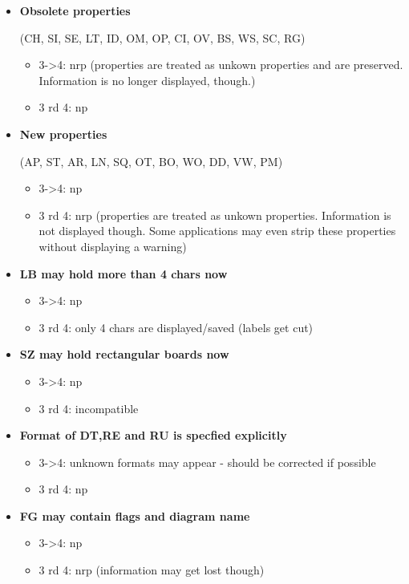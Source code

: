 \begin{itemize}
\item
  \textbf{Obsolete properties}

  (CH, SI, SE, LT, ID, OM, OP, CI, OV, BS, WS, SC, RG)

  \begin{itemize}
  \item
    3-\textgreater4: nrp (properties are treated as unkown properties
    and are preserved. Information is no longer displayed, though.)
  \item
    3 rd 4: np
  \end{itemize}
\item
  \textbf{New properties}

  (AP, ST, AR, LN, SQ, OT, BO, WO, DD, VW, PM)

  \begin{itemize}
  \item
    3-\textgreater4: np
  \item
    3 rd 4: nrp (properties are treated as unkown properties.
    Information is not displayed though. Some applications may even
    strip these properties without displaying a warning)
  \end{itemize}
\item
  \textbf{LB may hold more than 4 chars now}

  \begin{itemize}
  \item
    3-\textgreater4: np
  \item
    3 rd 4: only 4 chars are displayed/saved (labels get cut)
  \end{itemize}
\item
  \textbf{SZ may hold rectangular boards now}

  \begin{itemize}
  \item
    3-\textgreater4: np
  \item
    3 rd 4: incompatible
  \end{itemize}
\item
  \textbf{Format of DT,RE and RU is specfied explicitly}

  \begin{itemize}
  \item
    3-\textgreater4: unknown formats may appear - should be corrected if
    possible
  \item
    3 rd 4: np
  \end{itemize}
\item
  \textbf{FG may contain flags and diagram name}

  \begin{itemize}
  \item
    3-\textgreater4: np
  \item
    3 rd 4: nrp (information may get lost though)
  \end{itemize}
\end{itemize}

